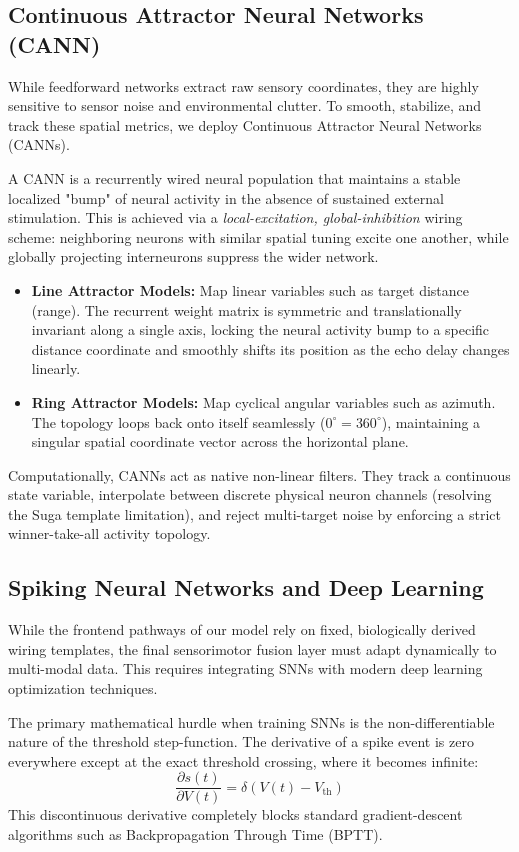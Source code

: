 \subsection{Continuous Attractor Neural Networks (CANN)}
While feedforward networks extract raw sensory coordinates, they are highly sensitive to sensor noise and environmental clutter. To smooth, stabilize, and track these spatial metrics, we deploy Continuous Attractor Neural Networks (CANNs).

A CANN is a recurrently wired neural population that maintains a stable localized "bump" of neural activity in the absence of sustained external stimulation. This is achieved via a \textit{local-excitation, global-inhibition} wiring scheme: neighboring neurons with similar spatial tuning excite one another, while globally projecting interneurons suppress the wider network.

\begin{itemize}
    \item \textbf{Line Attractor Models:} Map linear variables such as target distance (range). The recurrent weight matrix is symmetric and translationally invariant along a single axis, locking the neural activity bump to a specific distance coordinate and smoothly shifts its position as the echo delay changes linearly.
    \item \textbf{Ring Attractor Models:} Map cyclical angular variables such as azimuth. The topology loops back onto itself seamlessly ($0^{\circ} = 360^{\circ}$), maintaining a singular spatial coordinate vector across the horizontal plane.
\end{itemize}

Computationally, CANNs act as native non-linear filters. They track a continuous state variable, interpolate between discrete physical neuron channels (resolving the Suga template limitation), and reject multi-target noise by enforcing a strict winner-take-all activity topology.

\subsection{Spiking Neural Networks and Deep Learning}
While the frontend pathways of our model rely on fixed, biologically derived wiring templates, the final sensorimotor fusion layer must adapt dynamically to multi-modal data. This requires integrating SNNs with modern deep learning optimization techniques.

The primary mathematical hurdle when training SNNs is the non-differentiable nature of the threshold step-function. The derivative of a spike event is zero everywhere except at the exact threshold crossing, where it becomes infinite:
\begin{equation}
    \frac{\partial s(t)}{\partial V(t)} = \delta(V(t) - V_{\text{th}})
\end{equation}
This discontinuous derivative completely blocks standard gradient-descent algorithms such as Backpropagation Through Time (BPTT).

